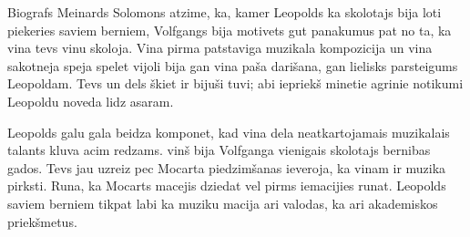 \documentclass[a4paper]{article}
\begin{document}
Biografs Meinards Solomons atzime, ka, kamer Leopolds ka skolotajs bija loti piekeries saviem berniem, Volfgangs bija motivets gut panakumus pat no ta, ka vina tevs vinu skoloja. Vina pirma patstaviga muzikala kompozicija un vina sakotneja speja spelet vijoli bija gan vina paša darišana, gan lielisks parsteigums Leopoldam. Tevs un dels škiet ir bijuši tuvi; abi iepriekš minetie agrinie notikumi Leopoldu noveda lidz asaram.

Leopolds galu gala beidza komponet, kad vina dela neatkartojamais muzikalais talants kluva acim redzams. vinš bija Volfganga vienigais skolotajs bernibas gados. Tevs jau uzreiz pec Mocarta piedzimšanas ieveroja, ka vinam ir muzika pirksti. Runa, ka Mocarts macejis dziedat vel pirms iemacijies runat. Leopolds saviem berniem tikpat labi ka muziku macija ari valodas, ka ari akademiskos priekšmetus.\\
\pagebreak
\end{document}
